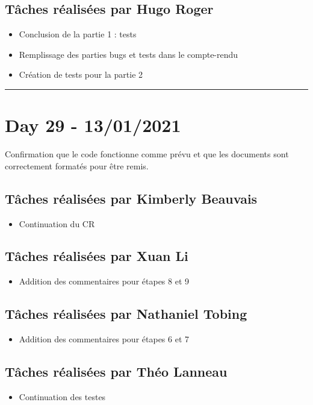 \documentclass[11pt,letterpaper]{article}
\begin{document}
\subsection*{Tâches réalisées par Hugo Roger}
\begin{itemize}
    \item Conclusion de la partie 1 : tests
    \item Remplissage des parties bugs et tests dans le compte-rendu
    \item Création de tests pour la partie 2
\end{itemize}

\noindent\rule{13cm}{0.4pt}

\section*{Day 29 - 13/01/2021}
Confirmation que le code fonctionne comme prévu et que les documents sont 
correctement formatés pour être remis.

\subsection*{Tâches réalisées par Kimberly Beauvais}
\begin{itemize}
    \item Continuation du CR
\end{itemize}

\subsection*{Tâches réalisées par Xuan Li}
\begin{itemize}
    \item Addition des commentaires pour étapes 8 et 9
\end{itemize}

\subsection*{Tâches réalisées par Nathaniel Tobing}
\begin{itemize}
    \item Addition des commentaires pour étapes 6 et 7
\end{itemize}

\subsection*{Tâches réalisées par Théo Lanneau}
\begin{itemize}
    \item Continuation des testes
\end{itemize}
\end{document}

